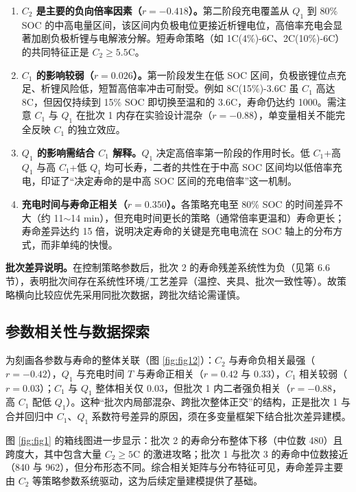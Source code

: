 \documentclass[withoutpreface]{cumcmthesis}
\begin{document}
\begin{enumerate}
\item \textbf{$C_2$ 是主要的负向倍率因素（$r=-0.418$）。}第二阶段充电覆盖从 $Q_1$ 到 80\% SOC 的中高电量区间，该区间内负极电位更接近析锂电位，高倍率充电会显著加剧负极析锂与电解液分解。短寿命策略（如 1C(4\%)-6C、2C(10\%)-6C）的共同特征正是 $C_2\ge5.5$C。
\item \textbf{$C_1$ 的影响较弱（$r=0.026$）。}第一阶段发生在低 SOC 区间，负极嵌锂位点充足、析锂风险低，短暂高倍率冲击可耐受。例如 8C(15\%)-3.6C 虽 $C_1$ 高达 8C，但因仅持续到 15\% SOC 即切换至温和的 3.6C，寿命仍达约 1000。需注意 $C_1$ 与 $Q_1$ 在批次 1 内存在实验设计混杂（$r=-0.88$），单变量相关不能完全反映 $C_1$ 的独立效应。
\item \textbf{$Q_1$ 的影响需结合 $C_1$ 解释。}$Q_1$ 决定高倍率第一阶段的作用时长。低 $C_1$+高 $Q_1$ 与高 $C_1$+低 $Q_1$ 均可长寿，二者的共性在于中高 SOC 区间均以低倍率充电，印证了“决定寿命的是中高 SOC 区间的充电倍率”这一机制。
\item \textbf{充电时间与寿命正相关（$r=0.350$）。}各策略充电至 80\% SOC 的时间差异不大（约 11$\sim$14 min），但充电时间更长的策略（通常倍率更温和）寿命更长；寿命差异达约 15 倍，说明决定寿命的关键是充电电流在 SOC 轴上的分布方式，而非单纯的快慢。
\end{enumerate}

\textbf{批次差异说明。}在控制策略参数后，批次 2 的寿命残差系统性为负（见第 6.6 节），表明批次间存在系统性环境/工艺差异（温控、夹具、批次一致性等）。故策略横向比较应优先采用同批次数据，跨批次结论需谨慎。

\subsection{参数相关性与数据探索}\label{sec:eda}

为刻画各参数与寿命的整体关联（图 \ref{fig:fig12}）：$C_2$ 与寿命负相关最强（$r=-0.42$），$Q_1$ 与充电时间 $T$ 与寿命正相关（$r=0.42$ 与 $0.33$），$C_1$ 相关较弱（$r=0.03$）；$C_1$ 与 $Q_1$ 整体相关仅 $0.03$，但批次 1 内二者强负相关（$r=-0.88$，高 $C_1$ 配低 $Q_1$）。这种“批次内局部混杂、跨批次整体正交”的结构，正是批次 1 与合并回归中 $C_1$、$Q_1$ 系数符号差异的原因，须在多变量框架下结合批次差异建模。

图 \ref{fig:fig1} 的箱线图进一步显示：批次 2 的寿命分布整体下移（中位数 480）且跨度大，其中包含大量 $C_2\ge5$C 的激进攻略；批次 1 与批次 3 的寿命中位数接近（840 与 962），但分布形态不同。综合相关矩阵与分布特征可见，寿命差异主要由 $C_2$ 等策略参数系统驱动，这为后续定量建模提供了基础。
\end{document}
